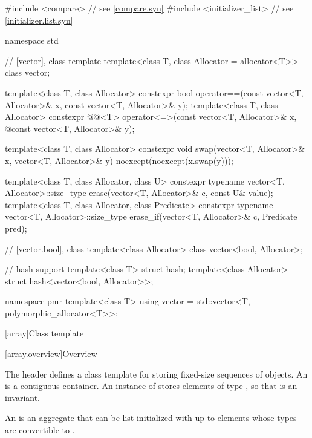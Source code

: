%
\begin{codeblock}
#include <compare>              // see \ref{compare.syn}
#include <initializer_list>     // see \ref{initializer.list.syn}

namespace std {
  // \ref{vector}, class template 
  template<class T, class Allocator = allocator<T>> class vector;

  template<class T, class Allocator>
    constexpr bool operator==(const vector<T, Allocator>& x, const vector<T, Allocator>& y);
  template<class T, class Allocator>
    constexpr @@<T> operator<=>(const vector<T, Allocator>& x,
              @\itcorr@                                      const vector<T, Allocator>& y);

  template<class T, class Allocator>
    constexpr void swap(vector<T, Allocator>& x, vector<T, Allocator>& y)
      noexcept(noexcept(x.swap(y)));

  template<class T, class Allocator, class U>
    constexpr typename vector<T, Allocator>::size_type
      erase(vector<T, Allocator>& c, const U& value);
  template<class T, class Allocator, class Predicate>
    constexpr typename vector<T, Allocator>::size_type
      erase_if(vector<T, Allocator>& c, Predicate pred);

  // \ref{vector.bool}, class 
  template<class Allocator> class vector<bool, Allocator>;

  // hash support
  template<class T> struct hash;
  template<class Allocator> struct hash<vector<bool, Allocator>>;

  namespace pmr {
    template<class T>
      using vector = std::vector<T, polymorphic_allocator<T>>;
  }
}
\end{codeblock}

[array]{Class template }
%

[array.overview]{Overview}

\pnum
{}%
The header  defines a class template for storing fixed-size
sequences of objects.
An  is a contiguous container.
An instance of  stores  elements of type ,
so that  is an invariant.

\pnum
{}%
%
An  is an aggregate that can be
list-initialized with up
to  elements whose types are convertible to .

